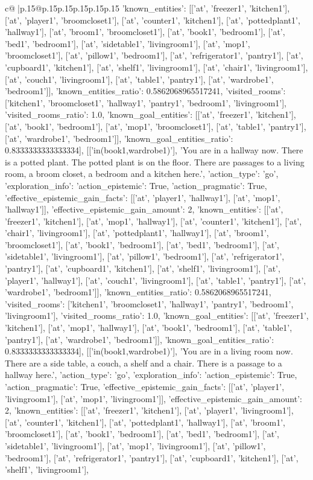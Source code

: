 \documentclass{article}
\begin{document}
{\begin{supertabular}{c@{$\;$}|p{.15\linewidth}@{}p{.15\linewidth}p{.15\linewidth}p{.15\linewidth}p{.15\linewidth}p{.15\linewidth}}
{{{'known_entities': [['at', 'freezer1', 'kitchen1'], ['at', 'player1', 'broomcloset1'], ['at', 'counter1', 'kitchen1'], ['at', 'pottedplant1', 'hallway1'], ['at', 'broom1', 'broomcloset1'], ['at', 'book1', 'bedroom1'], ['at', 'bed1', 'bedroom1'], ['at', 'sidetable1', 'livingroom1'], ['at', 'mop1', 'broomcloset1'], ['at', 'pillow1', 'bedroom1'], ['at', 'refrigerator1', 'pantry1'], ['at', 'cupboard1', 'kitchen1'], ['at', 'shelf1', 'livingroom1'], ['at', 'chair1', 'livingroom1'], ['at', 'couch1', 'livingroom1'], ['at', 'table1', 'pantry1'], ['at', 'wardrobe1', 'bedroom1']], 'known_entities_ratio': 0.5862068965517241, 'visited_rooms': ['kitchen1', 'broomcloset1', 'hallway1', 'pantry1', 'bedroom1', 'livingroom1'], 'visited_rooms_ratio': 1.0, 'known_goal_entities': [['at', 'freezer1', 'kitchen1'], ['at', 'book1', 'bedroom1'], ['at', 'mop1', 'broomcloset1'], ['at', 'table1', 'pantry1'], ['at', 'wardrobe1', 'bedroom1']], 'known_goal_entities_ratio': 0.8333333333333334}}], [['in(book1,wardrobe1)'], 'You are in a hallway now. There is a potted plant. The potted plant is on the floor. There are passages to a living room, a broom closet, a bedroom and a kitchen here.', {'action_type': 'go', 'exploration_info': {'action_epistemic': True, 'action_pragmatic': True, 'effective_epistemic_gain_facts': [['at', 'player1', 'hallway1'], ['at', 'mop1', 'hallway1']], 'effective_epistemic_gain_amount': 2, 'known_entities': [['at', 'freezer1', 'kitchen1'], ['at', 'mop1', 'hallway1'], ['at', 'counter1', 'kitchen1'], ['at', 'chair1', 'livingroom1'], ['at', 'pottedplant1', 'hallway1'], ['at', 'broom1', 'broomcloset1'], ['at', 'book1', 'bedroom1'], ['at', 'bed1', 'bedroom1'], ['at', 'sidetable1', 'livingroom1'], ['at', 'pillow1', 'bedroom1'], ['at', 'refrigerator1', 'pantry1'], ['at', 'cupboard1', 'kitchen1'], ['at', 'shelf1', 'livingroom1'], ['at', 'player1', 'hallway1'], ['at', 'couch1', 'livingroom1'], ['at', 'table1', 'pantry1'], ['at', 'wardrobe1', 'bedroom1']], 'known_entities_ratio': 0.5862068965517241, 'visited_rooms': ['kitchen1', 'broomcloset1', 'hallway1', 'pantry1', 'bedroom1', 'livingroom1'], 'visited_rooms_ratio': 1.0, 'known_goal_entities': [['at', 'freezer1', 'kitchen1'], ['at', 'mop1', 'hallway1'], ['at', 'book1', 'bedroom1'], ['at', 'table1', 'pantry1'], ['at', 'wardrobe1', 'bedroom1']], 'known_goal_entities_ratio': 0.8333333333333334}}], [['in(book1,wardrobe1)'], 'You are in a living room now. There are a side table, a couch, a shelf and a chair. There is a passage to a hallway here.', {'action_type': 'go', 'exploration_info': {'action_epistemic': True, 'action_pragmatic': True, 'effective_epistemic_gain_facts': [['at', 'player1', 'livingroom1'], ['at', 'mop1', 'livingroom1']], 'effective_epistemic_gain_amount': 2, 'known_entities': [['at', 'freezer1', 'kitchen1'], ['at', 'player1', 'livingroom1'], ['at', 'counter1', 'kitchen1'], ['at', 'pottedplant1', 'hallway1'], ['at', 'broom1', 'broomcloset1'], ['at', 'book1', 'bedroom1'], ['at', 'bed1', 'bedroom1'], ['at', 'sidetable1', 'livingroom1'], ['at', 'mop1', 'livingroom1'], ['at', 'pillow1', 'bedroom1'], ['at', 'refrigerator1', 'pantry1'], ['at', 'cupboard1', 'kitchen1'], ['at', 'shelf1', 'livingroom1'], }}}
\end{supertabular}}
\end{document}

